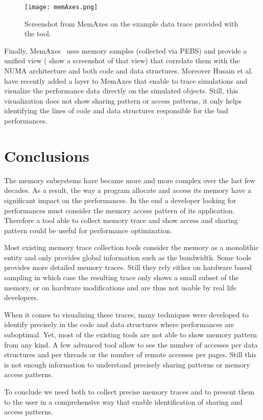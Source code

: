 \begin{figure}[htb]
    \centering
    \texttt{[image: memAxes.png]}
    \caption{Screenshot from MemAxes on the example data trace provided with the
    tool.}
    \label{fig:memaxes}
\end{figure}

Finally, \gls{MemAxes}~\cite{Gimenez14Dissecting} uses memory samples (collected via \gls{PEBS}) and provide a unified view ( show a screenshot of that view) that correlate them with the \gls{NUMA} architecture and both code and data structures.
Moreover Husain et al.~\cite{Husain15Relating} have recently added a layer to \gls{MemAxes} that enable to trace simulations and visualize the performance data directly on the simulated objects.
Still, this visualization does not show sharing pattern or access patterns, it only helps identifying the lines of code and data structures responsible for the bad performances.

\section{Conclusions}
\label{sec:mem-cncl}

The memory subsystems have became more and more complex over the last few decades.
As a result, the way a program allocate and access its memory have a significant impact on the performances.
In the end a developer looking for performances must consider the memory access pattern of its application.
Therefore a tool able to collect memory trace and show access and sharing pattern could be useful for performance optimization.

Most existing memory trace collection tools consider the memory as a monolithic entity and only provides global information such as the bandwidth.
Some tools provides more detailed memory traces.
Still they rely either on  hardware based sampling in which case the resulting trace only shows a small subset of the memory, or on hardware modifications and are thus not usable by real life developers.

When it comes to visualizing these traces, many techniques were developed to identify precisely in the code and data structures where performances are suboptimal.
Yet, most of the existing tools are not able to show memory pattern from any kind.
A few advanced tool allow to see the number of accesses per data structures and per threads or the number of remote accesses per pages.
Still this is not enough information to understand precisely sharing patterns or memory access patterns.

To conclude we need both to collect precise memory traces and to present them to the user in a comprehensive way that enable identification of sharing and access patterns.
